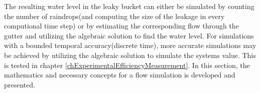 	The resulting water level in the leaky bucket can either be simulated by counting the number of raindrops(and computing the size of the leakage in every computional time step)
		or by estimating the corresponding flow through the gutter and utilizing the algebraic solution to find the water level.
	For simulations with a bounded temporal accuracy(discrete time), more accurate simulations may be achieved by utilizing the algebraic solution to simulate the systems value.
	This is tested in chapter \ref{chExperimentalEfficiencyMeasurement}.
	In this section, the mathematics and necessary concepts for a flow simulation is developed and presented.





